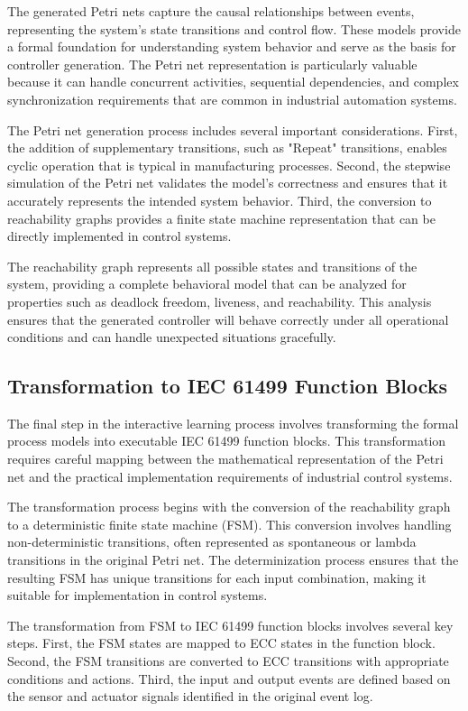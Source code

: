 The generated Petri nets capture the causal relationships between events, representing the system's state transitions and control flow. These models provide a formal foundation for understanding system behavior and serve as the basis for controller generation. The Petri net representation is particularly valuable because it can handle concurrent activities, sequential dependencies, and complex synchronization requirements that are common in industrial automation systems.


The Petri net generation process includes several important considerations. First, the addition of supplementary transitions, such as "Repeat" transitions, enables cyclic operation that is typical in manufacturing processes. Second, the stepwise simulation of the Petri net validates the model's correctness and ensures that it accurately represents the intended system behavior. Third, the conversion to reachability graphs provides a finite state machine representation that can be directly implemented in control systems.

The reachability graph represents all possible states and transitions of the system, providing a complete behavioral model that can be analyzed for properties such as deadlock freedom, liveness, and reachability. This analysis ensures that the generated controller will behave correctly under all operational conditions and can handle unexpected situations gracefully.

\subsection{Transformation to IEC 61499 Function Blocks}

The final step in the interactive learning process involves transforming the formal process models into executable IEC 61499 function blocks. This transformation requires careful mapping between the mathematical representation of the Petri net and the practical implementation requirements of industrial control systems.

The transformation process begins with the conversion of the reachability graph to a deterministic finite state machine (FSM). This conversion involves handling non-deterministic transitions, often represented as spontaneous or lambda transitions in the original Petri net. The determinization process ensures that the resulting FSM has unique transitions for each input combination, making it suitable for implementation in control systems.


The transformation from FSM to IEC 61499 function blocks involves several key steps. First, the FSM states are mapped to ECC states in the function block. Second, the FSM transitions are converted to ECC transitions with appropriate conditions and actions. Third, the input and output events are defined based on the sensor and actuator signals identified in the original event log.

